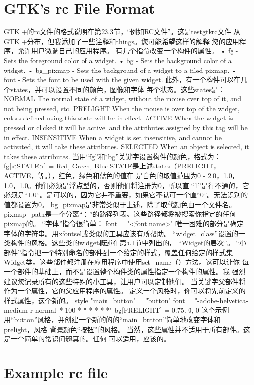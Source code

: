 \section{GTK's rc File Format}
GTK +的rc文件的格式说明在第23.3节，“例如RC文件”。这是testgtkrc文件
从GTK +分布，但我添加了一些注释和things。您可能希望这样的解释
您的应用程序，允许用户微调自己的应用程序。
有几个指令改变一个构件的属性。
• fg - Sets the foreground color of a widget.
• bg - Sets the background color of a widget.
• bg_pixmap - Sets the background of a widget to a tiled pixmap.
• font - Sets the font to be used with the given widget.
此外，有一个构件可以在几个states，​​并可以设置不同的颜色，图像和字体
每个状态。这些states是：
NORMAL
The normal state of a widget, without the mouse over top of it, and not being pressed, etc.
PRELIGHT
When the mouse is over top of the widget, colors defined using this state will be in effect.
ACTIVE
When the widget is pressed or clicked it will be active, and the attributes assigned by this
tag will be in effect.
INSENSITIVE
When a widget is set insensitive, and cannot be activated, it will take these attributes.
SELECTED
When an object is selected, it takes these attributes.
当用“fg”和“bg”关键字设置构件的颜色，格式为：
fg[<STATE>] = { Red, Green, Blue }
STATE是上述states（PRELIGHT，ACTIVE，等。），红色，绿色和蓝色的值在
是白色的取值范围为0  -  2.0，{1.0，1.0，1.0}。他们必须是浮点型的，否则他们将注册为0，所以直
“1”是行不通的，它必须是“1.0”。是可以的，因为它并不重要，如果它不认可一个直“0”。无法识别的
值都设置为0。
bg_pixmap是非常类似于上述，除了取代颜色由一个文件名。
pixmap_path是一个分离“：”的路径列表。这些路径都将被搜索你指定的任何pixmap的。
“字体”指令很简单：	
font = "<font name>"
唯一困难的部分是确定字体的字符串。用xfontsel或类似的工具应该有所帮助。
“widget_class”设置的一类构件的风格。这些类的widget概述在第5.1节中列出的，
“Widget的层次”。
“小部件”指令把一个特别命名的部件到一个给定的样式，覆盖任何给定的样式集
Widget类。这些部件都注册在应用程序中使用set_name（）方法。这可以让你
每一个部件的基础上，而不是设置整个构件类的属性指定一个构件的属性。我
强烈建议您记录所有的这些特殊的小工具，让用户可以定制他们。
当关键字父部件将作为一个属性，它的父应用程序的属性。
定义一个风格时，你可以将先前定义的样式属性，这个新的。
style "main_button" = "button"
{
	font = "-adobe-helvetica-medium-r-normal--*-100-*-*-*-*-*-*"
	bg[PRELIGHT] = { 0.75, 0, 0 }
}
这个示例用“button”风格，并创建一个新的的的“main_button”简单地改变字体和prelight，风格
背景颜色“按钮”的风格。
当然，这些属性并不适用于所有部件。这是一个简单的常识问题真的。任何
可以适用，应该的。
\section{Example rc file}
